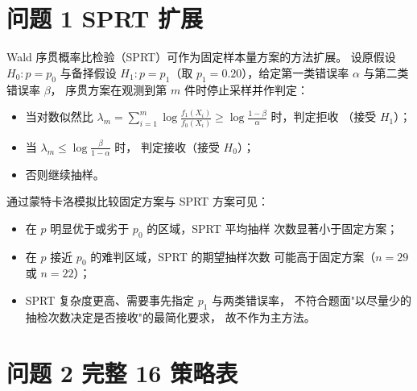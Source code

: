 \documentclass[withoutpreface,bwprint]{cumcmthesis}
\begin{document}
\begin{appendices}

\section{问题 1 SPRT 扩展}
\label{app:sprt}

Wald 序贯概率比检验（SPRT）可作为固定样本量方案的方法扩展。
设原假设 $H_0: p = p_0$ 与备择假设 $H_1: p = p_1$（取
$p_1 = 0.20$），给定第一类错误率 $\alpha$ 与第二类错误率 $\beta$，
序贯方案在观测到第 $m$ 件时停止采样并作判定：

\begin{itemize}
    \item 当对数似然比
    $\lambda_m = \sum_{i=1}^{m} \log \frac{f_1(X_i)}{f_0(X_i)}
    \geq \log \frac{1 - \beta}{\alpha}$ 时，判定拒收
    （接受 $H_1$）；
    \item 当 $\lambda_m \leq \log \frac{\beta}{1 - \alpha}$ 时，
    判定接收（接受 $H_0$）；
    \item 否则继续抽样。
\end{itemize}

通过蒙特卡洛模拟比较固定方案与 SPRT 方案可见：
\begin{itemize}
    \item 在 $p$ 明显优于或劣于 $p_0$ 的区域，SPRT 平均抽样
    次数显著小于固定方案；
    \item 在 $p$ 接近 $p_0$ 的难判区域，SPRT 的期望抽样次数
    可能高于固定方案（$n = 29$ 或 $n = 22$）；
    \item SPRT 复杂度更高、需要事先指定 $p_1$ 与两类错误率，
    不符合题面"以尽量少的抽检次数决定是否接收"的最简化要求，
    故不作为主方法。
\end{itemize}

\clearpage

\section{问题 2 完整 16 策略表}


\end{appendices}
\end{document}
